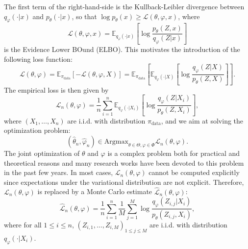 \documentclass[english,graybox,envcountchap,envcountsame,sectrefs,shortlabels]{svmono}
\theoremstyle{style}
\newcommand{\eqsp}{}
\begin{document}
The first term of the right-hand-side is the Kullback-Leibler divergence between $q_{\varphi}(\cdot|x)$ and $p_\theta(\cdot|x)$, so that $\log p_\theta(x)\geq \mathcal{L}(\theta,\varphi,x)$, where
$$
\mathcal{L}(\theta,\varphi,x) = \mathbb{E}_{q_{\varphi}(\cdot|x)}\left[\log \frac{p_\theta(Z,x)}{q_{\varphi}(Z|x)}\right]
$$
is the Evidence Lower BOund (ELBO). 
This motivates the introduction of the following loss function:
$$
\mathcal{L}(\theta,\varphi) = \mathbb{E}_{\pi_{\mathrm{data}}}[-\mathcal{L}(\theta,\varphi,X)] = \mathbb{E}_{\pi_{\mathrm{data}}}\left[\mathbb{E}_{q_{\varphi}(\cdot|X)}\left[\log \frac{q_{\varphi}(Z|X)}{p_\theta(Z,X)}\right]\right]\eqsp.
$$
The empirical loss is then given by
$$
\mathcal{L}_n(\theta,\varphi) = \frac{1}{n}\sum_{i=1}^n\mathbb{E}_{q_{\varphi}(\cdot|X_i)}\left[\log \frac{q_{\varphi}(Z|X_i)}{p_\theta(Z,X_i)}\right]\eqsp,
$$
where $(X_1,\ldots,X_n)$ are i.i.d. with distribution $\pi_{\mathrm{data}}$, and we aim at solving the optimization problem:
\begin{equation}
\label{eq:optim:ELBO}
(\widehat \theta_n,\widehat \varphi_n) \in \mathrm{Argmax}_{\theta\in\Theta,\varphi\in\Phi}\eqsp \mathcal{L}_n(\theta,\varphi) \eqsp.
\end{equation}
The joint optimization of $\theta$ and $\varphi$ is a complex problem both for practical and theoretical reasons and many research works have been devoted to this problem in the past few years. In most cases, $\mathcal{L}_n(\theta,\varphi)$ cannot be computed explicitly since expectations under the variational distribution are not explicit. Therefore, $\mathcal{L}_n(\theta,\varphi) $ is replaced by a Monte Carlo estimate $\widehat{\mathcal{L}}_n(\theta,\varphi)$:
$$
\widehat{\mathcal{L}}_n(\theta,\varphi) =  \frac{1}{n}\sum_{i=1}^n\frac{1}{M}\sum_{j=1}^M\log \frac{q_{\varphi}(Z_{i,j}|X_i)}{p_\theta(Z_{i,j},X_i)}\eqsp,
$$ 
where for all $1\leqslant i \leqslant n$, $(Z_{i,1},\ldots,Z_{i,M})_{1\leqslant j\leqslant M}$ are i.i.d. with distribution $q_{\varphi}(\cdot|X_i)$.
\end{document}
